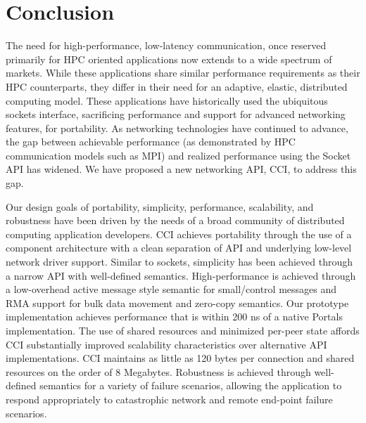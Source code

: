 \section{Conclusion}
\label{sec:conclusion}

The need for high-performance, low-latency communication, once
reserved primarily for HPC oriented applications now extends to a wide
spectrum of markets. While these applications share similar
performance requirements as their HPC counterparts, they differ in
their need for an adaptive, elastic, distributed computing
model. These applications have historically used the ubiquitous
sockets interface, sacrificing performance and support for advanced
networking features, for portability. As networking technologies have
continued to advance, the gap between achievable performance (as
demonstrated by HPC communication models such as MPI) and realized
performance using the Socket API has widened. We have proposed a new
networking API, CCI, to address this gap. 

Our design goals of portability, simplicity, performance, scalability,
and robustness have been driven by the needs of a broad community of
distributed computing application developers. CCI achieves portability
through the use of a component architecture with a clean separation of
API and underlying low-level network driver support. Similar to
sockets, simplicity has been achieved through a narrow API with
well-defined semantics. High-performance is achieved through a
low-overhead active message style semantic for small/control messages
and RMA support for bulk data movement and zero-copy
semantics. Our prototype implementation achieves performance that is
within 200 ns of a native Portals implementation. The use of shared
resources and minimized per-peer state affords CCI substantially
improved scalability characteristics over alternative API
implementations. CCI maintains as little as 120 bytes per connection
and shared resources on the order of 8 Megabytes. Robustness is
achieved through well-defined semantics for a variety of failure
scenarios, allowing the application to respond appropriately to
catastrophic network and remote end-point failure scenarios.  


